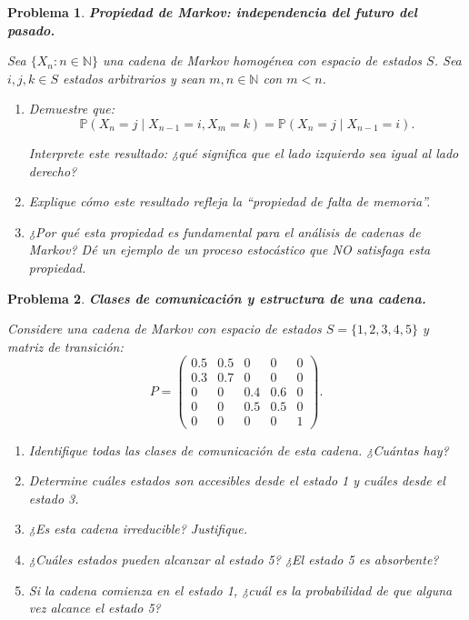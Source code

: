 \documentclass[12pt]{article}
\newtheorem{problem}{Problema}
\begin{document}
\begin{problem}
\textbf{Propiedad de Markov: independencia del futuro del pasado.}

Sea $\{X_n : n \in \mathbb{N}\}$ una cadena de Markov homogénea con espacio de estados $S$. Sea $i, j, k \in S$ estados arbitrarios y sean $m, n \in \mathbb{N}$ con $m < n$.

\begin{enumerate}
    \item[(a)] Demuestre que:
    \[
    \mathbb{P}(X_{n} = j \mid X_{n-1} = i, X_{m} = k) = \mathbb{P}(X_{n} = j \mid X_{n-1} = i).
    \]
    
    Interprete este resultado: ¿qué significa que el lado izquierdo sea igual al lado derecho?

    
    \item[(b)] Explique cómo este resultado refleja la ``propiedad de falta de memoria''. 
    \item[(c)] ¿Por qué esta propiedad es fundamental para el análisis de cadenas de Markov? Dé un ejemplo de un proceso estocástico que NO satisfaga esta propiedad.
\end{enumerate}
\end{problem}

\begin{problem}
\textbf{Clases de comunicación y estructura de una cadena.}

Considere una cadena de Markov con espacio de estados $S = \{1, 2, 3, 4, 5\}$ y matriz de transición:
\[
P = \begin{pmatrix}
0.5 & 0.5 & 0 & 0 & 0 \\
0.3 & 0.7 & 0 & 0 & 0 \\
0 & 0 & 0.4 & 0.6 & 0 \\
0 & 0 & 0.5 & 0.5 & 0 \\
0 & 0 & 0 & 0 & 1
\end{pmatrix}.
\]

\begin{enumerate}
    \item[(a)] Identifique todas las clases de comunicación de esta cadena. ¿Cuántas hay?
    
    \item[(b)] Determine cuáles estados son accesibles desde el estado 1 y cuáles desde el estado 3.
    
    \item[(c)] ¿Es esta cadena irreducible? Justifique.
    
    \item[(d)] ¿Cuáles estados pueden alcanzar al estado 5? ¿El estado 5 es absorbente?
    
    \item[(e)] Si la cadena comienza en el estado 1, ¿cuál es la probabilidad de que alguna vez alcance el estado 5?
\end{enumerate}
\end{problem}
\end{document}
